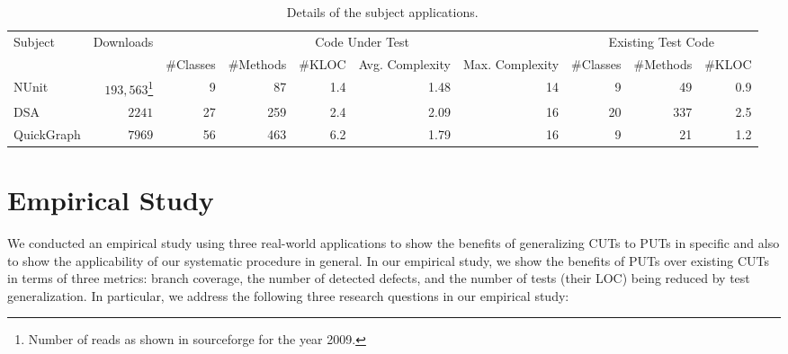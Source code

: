 \begin{table*}[t]%
\centering
\begin{minipage}{\textwidth}
\centering
\begin{tabular}{|l|r|r|r|r|r|r|r|r|r|}
\hline
Subject 		& Downloads 	& \multicolumn{5}{|c|}{Code Under Test} 															&	\multicolumn{3}{|c|}{Existing Test Code} 	\\ \cline{3-10}
						& 						&	\#Classes	&	\#Methods	& \#KLOC	& Avg. Complexity & Max. Complexity	&	\#Classes	&	\#Methods &	\#KLOC						\\ \hline\hline
NUnit				&		$193,563$\footnote{Number of reads as shown in sourceforge for the year 2009.}
													&	9					&	87  			&		1.4		&				1.48 			& 14 							&			9			&			49		&		0.9							\\ \hline
DSA					&		$2241$		&	27  			&	259 			&		2.4		&				2.09 			& 16							&			20		&			337		&		2.5							\\ \hline		
QuickGraph	&		$7969$ 		&	56				&	463				&		6.2		&				1.79			& 16							&			9			&			21		&		1.2							\\ \hline
\end{tabular}
\end{minipage} \vspace*{-3ex}
\caption{Details of the subject applications.} \vspace*{-3ex}
\label{tab:subjectmetrics}
\end{table*} 

\section{Empirical Study}
\label{sec:study}

We conducted an empirical study using three real-world applications to show the benefits of generalizing CUTs to PUTs in specific and also to show the applicability of our systematic procedure in general. In our empirical study, we show the benefits of PUTs over existing CUTs in terms of three metrics: branch coverage, the number of detected defects, and the number of tests (their LOC) being reduced by test generalization. In particular, we address the following three research questions in our empirical study:

